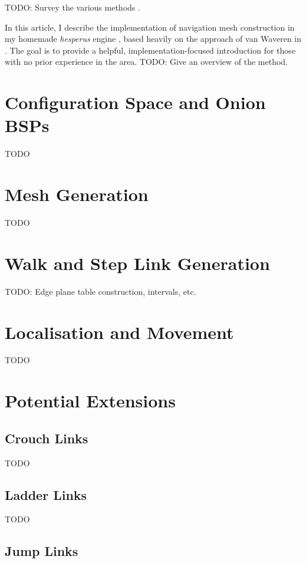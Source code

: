 \documentclass[10pt,onecolumn]{article}
\begin{document}
TODO: Survey the various methods \cite{axelrod08,farnstrom06,hale11,hamm08,kallmann10,mcanlis08,mononen09,oliva11,pettre05,ratcliff08,tozour02,vantoll11,vanwaveren01,wein05}.

In this article, I describe the implementation of navigation mesh construction in my homemade \emph{hesperus} engine \cite{hesperus}, based heavily on the approach of van Waveren in \cite{vanwaveren01}. The goal is to provide a helpful, implementation-focused introduction for those with no prior experience in the area. TODO: Give an overview of the method.

\section*{Configuration Space and Onion BSPs}

TODO

\section*{Mesh Generation}

TODO

\section*{Walk and Step Link Generation}

TODO: Edge plane table construction, intervals, etc.

\section*{Localisation and Movement}

TODO

\section*{Potential Extensions}

\subsection*{Crouch Links}

TODO

\subsection*{Ladder Links}

TODO

\subsection*{Jump Links}
\end{document}
